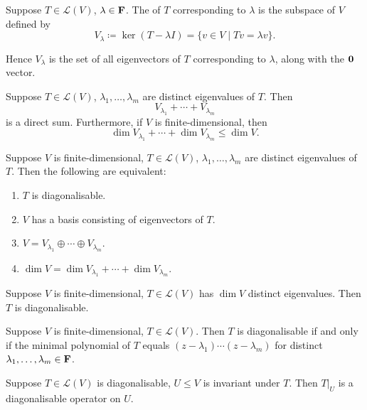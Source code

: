 \begin{definition}[Eigenspace]
Suppose $T\in\mathcal{L}(V)$, $\lambda\in\mathbf F$. The  of $T$ corresponding to $\lambda$ is the subspace of $V$ defined by
\[V_\lambda\coloneqq\ker(T-\lambda I)=\{v\in V\mid Tv=\lambda v\}.\]
\end{definition}

\begin{remark}
Hence $V_\lambda$ is the set of all eigenvectors of $T$ corresponding to $\lambda$, along with the $\vb{0}$ vector.
\end{remark}

\begin{proposition}
Suppose $T\in\mathcal{L}(V)$, $\lambda_1,\dots,\lambda_m$ are distinct eigenvalues of $T$. Then
\[V_{\lambda_1}+\cdots+V_{\lambda_m}\]
is a direct sum. Furthermore, if $V$ is finite-dimensional, then
\[\dim V_{\lambda_1}+\cdots+\dim V_{\lambda_m}\le\dim V.\]
\end{proposition}

\begin{lemma}
Suppose $V$ is finite-dimensional, $T\in\mathcal{L}(V)$, $\lambda_1,\dots,\lambda_m$ are distinct eigenvalues of $T$. Then the following are equivalent:
\begin{enumerate}[label=(\roman*)]
\item $T$ is diagonalisable.
\item $V$ has a basis consisting of eigenvectors of $T$.
\item $V=V_{\lambda_1}\oplus\cdots\oplus V_{\lambda_m}$.
\item $\dim V=\dim V_{\lambda_1}+\cdots+\dim V_{\lambda_m}$.
\end{enumerate}
\end{lemma}

\begin{corollary}
Suppose $V$ is finite-dimensional, $T\in\mathcal{L}(V)$ has $\dim V$ distinct eigenvalues. Then $T$ is diagonalisable.
\end{corollary}

\begin{theorem}
Suppose $V$ is finite-dimensional, $T\in\mathcal{L}(V)$. Then $T$ is diagonalisable if and only if the minimal polynomial of $T$ equals $(z-\lambda_1)\cdots(z-\lambda_m)$ for distinct $\lambda_1,\dots,\lambda_m\in\mathbf F$.
\end{theorem}

\begin{corollary}
Suppose $T\in\mathcal{L}(V)$ is diagonalisable, $U\le V$ is invariant under $T$. Then $T|_U$ is a diagonalisable operator on $U$.
\end{corollary}

